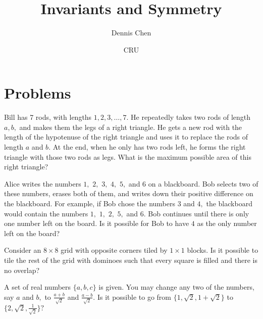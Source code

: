 \documentclass[mast]{lucky}
\title{Invariants and Symmetry}
\author{Dennis Chen}
\date{CRU}
\begin{document}
\maketitle



\pagebreak

\section{Problems}



\begin{prob}{2}
Bill has 7 rods, with lengths $1,2,3,\dots,7.$ He repeatedly takes two rods of length $a,b,$ and makes them the legs of a right triangle. He gets a new rod with the length of the hypotenuse of the right triangle and uses it to replace the rods of length $a$ and $b.$ At the end, when he only has two rods left, he forms the right triangle with those two rods as legs. What is the maximum possible area of this right triangle?
\end{prob}

\begin{prob}[]{2}
Alice writes the numbers $1,$ $2,$ $3,$ $4,$ $5,$ and $6$ on a blackboard. Bob selects two of these numbers, erases both of them, and writes down their positive difference on the blackboard. For example, if Bob chose the numbers $3$ and $4,$ the blackboard would contain the numbers $1,$ $1,$ $2,$ $5,$ and $6.$ Bob continues until there is only one number left on the board. Is it possible for Bob to have $4$ as the only number left on the board?
\end{prob}

\begin{prob}[]{3}
Consider an $8\times 8$ grid with opposite corners tiled by $1\times 1$ blocks. Is it possible to tile the rest of the grid with dominoes such that every square is filled and there is no overlap?
\end{prob}

\begin{prob}[]{3}
A set of real numbers $\{a,b,c\}$ is given. You may change any two of the numbers, say $a$ and $b,$ to $\frac{a+b}{\sqrt{2}}$ and $\frac{a-b}{\sqrt{2}}.$ Is it possible to go from $\{1,\sqrt{2},1+\sqrt{2}\}$ to $\{2,\sqrt{2},\frac{1}{\sqrt{2}}\}?$
\end{prob}
\end{document}
